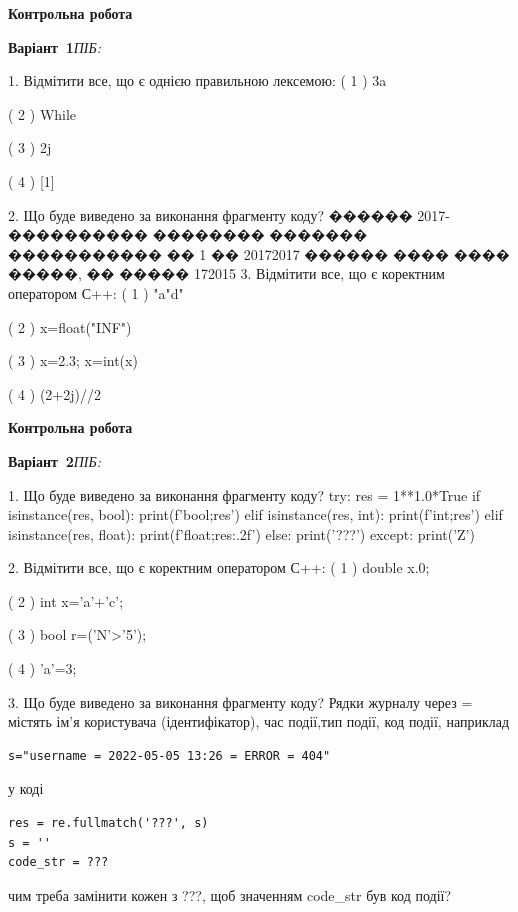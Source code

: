 \documentclass[11pt]{article}
\begin{document}
{\large\textbf{Контрольна робота}}

\textbf{Варіант \No\,1}\hfill \textit{ПІБ:}\,\underline{\hspace{60mm}}
\vspace{4mm}

1. Відмітити все, що є однією правильною лексемою:
( 1 ) 3a

( 2 ) While

( 3 ) 2j

( 4 ) [1]

2. Що буде виведено за виконання фрагменту коду?
������ 2017-���������� �������� ������� ����������� �� 1 �� 20172017 ������ ���� ���� �����, �� ����� 172015
3. Відмітити все, що є коректним оператором С++:
( 1 ) "a"d"

( 2 ) x=float("INF")

( 3 ) x=2.3; x=int(x)

( 4 ) (2+2j)//2




\newpage

\newpage

{\large\textbf{Контрольна робота}}

\textbf{Варіант \No\,2}\hfill \textit{ПІБ:}\,\underline{\hspace{60mm}}
\vspace{4mm}

1. Що буде виведено за виконання фрагменту коду?
try:
    res = 1**1.0*True
    if isinstance(res, bool):
        print(f'bool;{res}')
    elif isinstance(res, int):
        print(f'int;{res}')
    elif isinstance(res, float):
        print(f'float;{res:.2f}')
    else:
        print('???')
except:
    print('Z')

2. Відмітити все, що є коректним оператором С++:
( 1 ) double x.0;

( 2 ) int x='a'+'c';

( 3 ) bool r=('N'>'5');

( 4 ) 'a'=3;

3. Що буде виведено за виконання фрагменту коду?
Рядки журналу через = містять ім'я користувача (ідентифікатор), час події,тип події, код події, наприклад
\begin{verbatim}
s="username = 2022-05-05 13:26 = ERROR = 404"
\end{verbatim}
у коді 
\begin{verbatim}
res = re.fullmatch('???', s) 
s = ''
code_str = ??? 
\end{verbatim}
чим треба замінити кожен з ???, щоб значенням code\_str був код події? 
\end{document}
